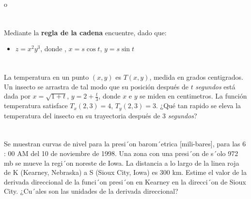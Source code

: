 o\documentclass[12pt]{article}
\begin{document}
\section{}

Mediante la \textbf{regla de la cadena} encuentre, dado que:

\begin{itemize}[format=\textbf]

\item $z=x^2y^3$, donde , $x=s\cos{t}$, $y=s\sin{t}$

\end{itemize}

\section{}

La temperatura en un punto $(x, y)$ es $T(x, y)$, medida en grados centigrados. Un insecto se arrastra de tal modo que su posición después de $t$ \textit{segundos} está dada por $x =
\sqrt{1 + t}$, $y = 2 + \frac{t}{3}$, donde $x$ e $y$ se miden en centimetros. La función temperatura satisface $T_x(2, 3) = 4$, $T_y(2, 3) = 3$.
¿Qué tan rapido se eleva la temperatura del insecto en su trayectoria después de 3 \textit{segundos}?

\section{}

Se muestran curvas de nivel para la presi´on barom´etrica [mili-bares], para
las 6 : 00 AM del 10 de noviembre de 1998. Una zona con una presi´on de
s´olo 972 mb se mueve la regi´on noreste de Iowa. La distancia a lo largo de
la linea roja de K (Kearney, Nebraska) a S (Sioux City, Iowa) es 300 km.
Estime el valor de la derivada direccional de la funci´on presi´on en Kearney
en la direcci´on de Sioux City. ¿Cu´ales son las unidades de la derivada
direccional?

\section{}
\end{document}
